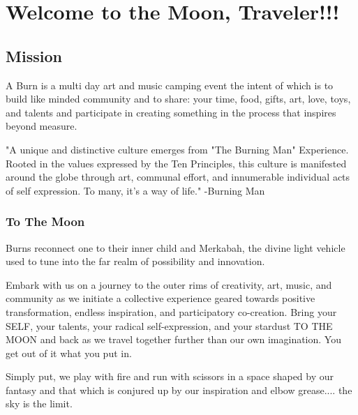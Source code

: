%
%

\chapter[Welcome]{Welcome to the Moon, Traveler!!!}



\section*{Mission}
A Burn is a  multi day art and music camping event the intent of which is to build like minded community and to share:
your time, food, gifts, art, love, toys, and talents and participate in creating something in the process that inspires beyond measure.

"A unique and distinctive culture emerges from "The Burning Man" Experience. Rooted in the values expressed by the Ten Principles, this culture is manifested around the globe through art, communal effort, and innumerable individual acts of self expression. To many, it's a way of life." -Burning Man

\subsection*{To The Moon}
Burns reconnect one to their inner child and Merkabah, the divine light vehicle used to tune into the far realm of possibility and innovation.

Embark with us on a journey to the outer rims of creativity, art, music, and community as we initiate a collective experience geared towards positive transformation, endless inspiration, and participatory
co-creation. Bring your SELF, your talents, your radical self-expression, and your stardust TO THE MOON and back as we travel together further than our own imagination. You get out of it what you put in.

Simply put, we play with fire and run with scissors in a space shaped by our fantasy and that which is conjured up by our inspiration and elbow grease.... the sky is the limit. 

